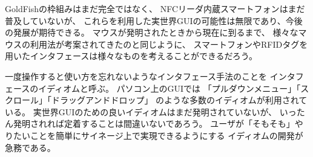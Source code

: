 \documentclass[a4j,11pt,twocolumn]{jarticle}
\def\SP{スマートフォン}
\begin{document}
GoldFishの枠組みはまだ完全ではなく、
NFCリーダ内蔵{\SP}はまだ普及していないが、
これらを利用した実世界GUIの可能性は無限であり、今後の発展が期待できる。
マウスが発明されたときから現在に到るまで、
様々なマウスの利用法が考案されてきたのと同じように、
{\SP}やRFIDタグを用いたインタフェースは様々なものを考えることができるだろう。

一度操作すると使い方を忘れないようなインタフェース手法のことを
インタフェースのイディオムと呼ぶ。
パソコン上のGUIでは
「プルダウンメニュー」「スクロール」「ドラッグアンドドロップ」
のような多数のイディオムが利用されている。
実世界GUIのための良いイディオムはまだ発明されていないが、
いったん発明されれば定着することは間違いないであろう。
ユーザが「そもそも」やりたいことを簡単にサイネージ上で実現できるようにする
イディオムの開発が急務である。

\scriptsize


\end{document}
